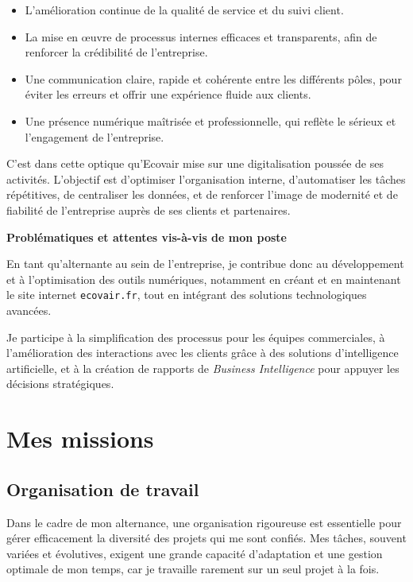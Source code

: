 \begin{itemize}
    \item L’amélioration continue de la qualité de service et du suivi client.
    \item La mise en œuvre de processus internes efficaces et transparents, afin de renforcer la crédibilité de l’entreprise.
    \item Une communication claire, rapide et cohérente entre les différents pôles, pour éviter les erreurs et offrir une expérience fluide aux clients.
    \item Une présence numérique maîtrisée et professionnelle, qui reflète le sérieux et l’engagement de l’entreprise.
\end{itemize}

C’est dans cette optique qu’Ecovair mise sur une digitalisation poussée de ses activités. L’objectif est d’optimiser l’organisation interne, d’automatiser les tâches répétitives, de centraliser les données, et de renforcer l’image de modernité et de fiabilité de l’entreprise auprès de ses clients et partenaires.

\textbf{Problématiques et attentes vis-à-vis de mon poste}

En tant qu'alternante au sein de l'entreprise, je contribue donc au développement et à l'optimisation des outils numériques, notamment en créant et en maintenant le site internet \texttt{ecovair.fr}, tout en intégrant des solutions technologiques avancées.

Je participe à la simplification des processus pour les équipes commerciales, à l'amélioration des interactions avec les clients grâce à des solutions d'intelligence artificielle, et à la création de rapports de \textit{Business Intelligence} pour appuyer les décisions stratégiques.



\section{Mes missions}
\label{missions}

\subsection{Organisation de travail}

Dans le cadre de mon alternance, une organisation rigoureuse est essentielle pour gérer efficacement la diversité des projets qui me sont confiés. Mes tâches, souvent variées et évolutives, exigent une grande capacité d’adaptation et une gestion optimale de mon temps, car je travaille rarement sur un seul projet à la fois.

